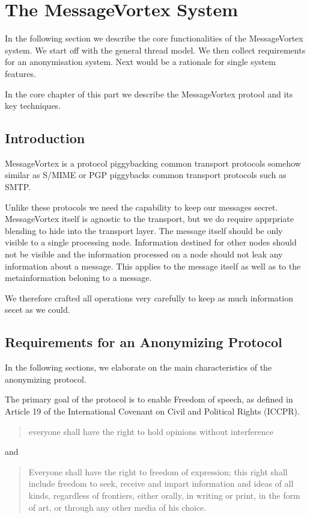 

\part{The  MessageVortex System}

In the following section we describe the core functionalities of the MessageVortex system. We start off with the general thread model. We then collect requirements for an anonymisation system. Next would be a rationale for single system features.

In the core chapter of this part we describe the MessageVortex protool and its key techniques.

\chapter{Introduction}
MessageVortex is a protocol piggybacking common transport protocols somehow similar as S/MIME\cite{RFC2015} or PGP\cite{PGP} piggybacks common transport protocols such as SMTP. 

Unlike these protocols we need the capability to keep our messages secret. MessageVortex itself is agnostic to the transport, but we do require apprpriate blending to hide into the transport layer. The message itself should be only visible to a single processing node. Information destined for other nodes should not be visible and the information processed on a node should not leak any information about a message. This applies to the message itself as well as to the metainformation beloning to a message.

We therefore crafted all operations very carefully to keep as much information secet as we could.

\chapter{Requirements for an Anonymizing Protocol\label{sec:genRequirements}}
In the following sections, we elaborate on the main characteristics of the anonymizing protocol. 

The primary goal of the protocol is to enable Freedom of speech, as defined in Article 19 of the International Covenant on Civil and Political Rights (ICCPR)\cite{iccpr}.
\begin{quote}
	everyone shall have the right to hold opinions without interference 
\end{quote}
and
\begin{quote}
	Everyone shall have the right to freedom of expression; this right shall include freedom to seek, receive and impart information and ideas of all kinds, regardless of frontiers, either orally, in writing or print, in the form of art, or through any other media of his choice.
\end{quote}


